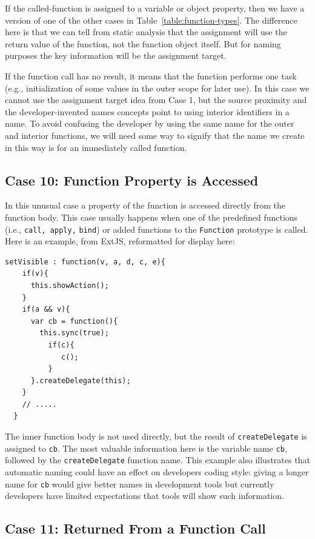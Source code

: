 \documentclass[10pt, preprint]{sigplanconf}
\begin{document}
If the called-function is assigned to a variable or object property, then we have a version of one of the other cases in Table~\ref{table:function-types}. The difference here is that we can tell from static analysis that the assignment will use the return value of the function, not the function object itself. But for naming purposes the key information will be the assignment target.

If the function call has no result, it means that the function performs one task (e.g., initialization of some values in the outer scope for later use). In this case we cannot use the assignment target idea from Case 1, but the source proximity and the developer-invented names concepts point to using interior identifiers in a name. To avoid confusing the developer by using the same name for the outer and interior functions, we will need some way to signify that the name we create in this way is for an immediately called function.

\subsection{Case 10: Function Property is Accessed}
\label{sec:funcprop}
In this unusual case a property of the function is accessed directly from the function body. This case usually happens when one of the predefined functions (i.e., \verb|call, apply,| \verb|bind|) or added functions to the \verb|Function| prototype is called.  Here is an example, from ExtJS, reformatted for display here:
\lstset{basicstyle=\scriptsize}
\begin{lstlisting}[frame=single, language=myLang]
  setVisible : function(v, a, d, c, e){
    if(v){
      this.showAction();
    }
    if(a && v){
      var cb = function(){
        this.sync(true);
          if(c){
             c();
          }
      }.createDelegate(this);
    }
    // .....
  }
\end{lstlisting}
The inner function body is not used directly, but the result of \verb|createDelegate| is assigned to \verb|cb|. The most valuable information here is the variable name \verb|cb|, followed by the \verb|createDelegate| function name.  This example also illustrates that automatic naming could have an effect on developers coding style:  giving a longer name for \verb|cb| would give better names in development tools but currently developers have limited expectations that tools will show such information.

\subsection{Case 11:  Returned From a Function Call}
\end{document}

